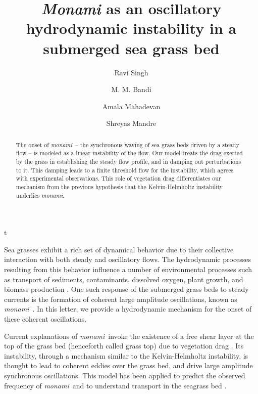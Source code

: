 \documentclass[aps,preprint,12pt]{revtex4-1}  %
\newcommand{\monami}{\textit{monami}}
\begin{document}
\title{\textit{Monami} as an oscillatory hydrodynamic instability in a submerged sea grass bed}
\author{Ravi Singh}t
\author{M. M. Bandi}
\author{Amala Mahadevan}
\author{Shreyas Mandre}

\begin{abstract}
The onset of \monami ~-- the synchronous waving of sea grass beds driven by a steady flow -- is modeled as a linear instability of the flow. Our model treats the drag exerted by the grass in establishing the steady flow profile, and in damping out perturbations to it. This damping leads to a finite threshold flow for the instability, which agrees with experimental observations. This role of vegetation drag differentiates our mechanism from the previous hypothesis that the Kelvin-Helmholtz instability underlies \monami.
\end{abstract}

\maketitle
Sea grasses exhibit a rich set of dynamical behavior due to their collective interaction with both steady and oscillatory flows.  
The hydrodynamic processes resulting from this behavior influence a number of environmental processes such as transport of sediments, contaminants, dissolved oxygen, plant growth, and biomass production  \cite{Fonseca87,Grizzle96,Nepf99,Nepf2012}. 
One such response of the submerged grass beds to steady currents is the formation of coherent large amplitude oscillations, known as \monami ~\cite{AckermanOkubo93}.  
In this letter, we provide a hydrodynamic mechanism for the onset of these coherent oscillations.

Current explanations of \monami ~invoke the existence of a free shear layer at the top of the grass bed (henceforth called grass top) due to vegetation drag  \cite{Ikeda96,Ghisal02,Raupach96}. 
Its instability, through a mechanism similar to the Kelvin-Helmholtz instability, is thought to lead to coherent eddies over the grass bed, and drive large amplitude synchronous oscillations.
This model has been applied to predict the observed frequency of \monami~and to understand transport in the seagrass bed \cite{Nepf00,Ghisal02,Nepf04,Okamoto12}.
\end{document}
